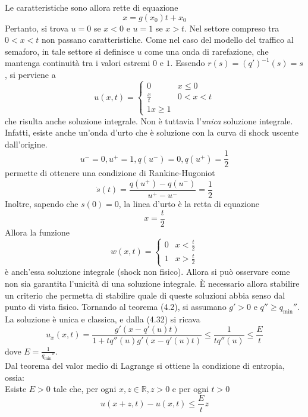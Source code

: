 \documentclass[a4paper,12pt, draft]{article}
\theoremstyle{break}
\numberwithin{equation}{section}
\begin{document}
Le caratteristiche sono allora rette di equazione 
\begin{equation}
  x = g(x_0) t + x_0
\end{equation}
Pertanto, si trova \(u = 0\) se \(x < 0\) e \(u = 1\) se \(x > t\). Nel settore compreso tra \(0 < x < t\) non passano caratteristiche. Come nel caso del modello del traffico al semaforo, in tale settore si definisce \(u\) come una onda di rarefazione, che mantenga continuità tra i valori estremi \(0 \mbox{ e } 1\). Essendo \(r(s) =(q')^{-1}(s) = s\), si perviene a 
\begin{equation}
  u(x,t) = \begin{cases}
    0 & x \leq 0 \\
    \frac{x}{t} & 0 < x < t \\
    1 x \geq 1
  \end{cases}
\end{equation}
che risulta anche soluzione integrale. 
Non è tuttavia l'\emph{unica} soluzione integrale. Infatti, esiste anche un'onda d'urto che è soluzione con la curva di shock uscente dall'origine. 
\[
u^- = 0, u^+ = 1, q(u^-) = 0, q(u^+) = \frac{1}{2}  
\]
permette di ottenere una condizione di Rankine-Hugoniot 
\[
\dot{s}(t) = \frac{q(u^+) - q(u^-)}{u^+ - u^-}   = \frac{1}{2}
\]
Inoltre, sapendo che \(s(0) = 0\), la linea d'urto è la retta di equazione 
\[
x = \frac{t}{2}  
\]
Allora la funzione
\[
w(x,t) = \begin{cases}
  0 & x < \frac{t}{2} \\
  1 & x > \frac{t}{2}
\end{cases}
\]
è anch'essa soluzione integrale (shock non fisico).
Allora si può osservare come non sia garantita l'unicità di una soluzione integrale. È necessario allora stabilire un criterio che permetta di stabilire quale di queste soluzioni abbia senso dal punto di vista fisico. 
Tornando al teorema (4.2), si assumano \(g' > 0\) e \(q'' \geq q_{\text{min}}''\). La soluzione è unica e classica, e dalla (4.32) si ricava 
\[
u_x (x,t) = \frac{g'(x-q'(u)t)}{1+tq''(u)g'(x-q'(u)t)} \leq   \frac{1}{tq''(u)} \leq \frac{E}{t}  
\]
dove \(E = \frac{1}{q_{\text{min}}''}\). \\
Dal teorema del valor medio di Lagrange si ottiene la condizione di entropia, ossia: \\
Esiste \(E > 0\) tale che, per ogni \(x, z \in \mathbb{R}, z > 0\) e per ogni \(t > 0\)
\begin{equation}
  u(x+z, t) - u(x,t) \leq \frac{E}{t}z
\end{equation}
\end{document}
